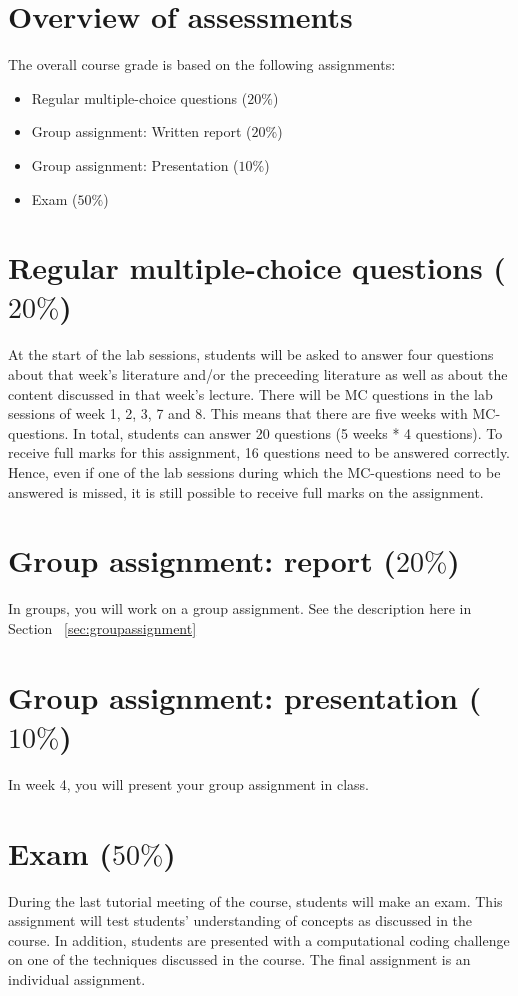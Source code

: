 \documentclass[a4paper,10pt]{report}
\begin{document}
\section{Overview of assessments}
The overall course grade is based on the following assignments:
\begin{itemize}
	\item Regular multiple-choice questions (\(20\%\))
	\item Group assignment: Written report (\(20\%\))
	\item Group assignment: Presentation (\(10\%\))
	\item Exam (\(50\%\))
\end{itemize}

\section{Regular multiple-choice questions ($20\%$)}
At the start of the lab sessions, students will be asked to answer four questions about that week's literature and/or the preceeding literature as well as about the content discussed in that week's lecture. There will be MC questions in the lab sessions of week 1, 2, 3, 7 and 8. This means that there are five weeks with MC-questions. In total, students can answer 20 questions (5 weeks * 4 questions). To receive full marks for this assignment, 16 questions need to be answered correctly. Hence, even if one of the lab sessions during which the MC-questions need to be answered is missed, it is still possible to receive full marks on the assignment.
	
\section{Group assignment: report ($20\%$)}
In groups, you will work on a group assignment. See the description here in Section ~\ref{sec:groupassignment}

\section{Group assignment: presentation ($10\%$)}
In week 4, you will present your group assignment in class. 

\section{Exam ($50\%$)}
During the last tutorial meeting of the course, students will make an exam. This assignment will test students' understanding of concepts as discussed in the course. In addition, students are presented with a computational coding challenge on one of the techniques discussed in the course. The final assignment is an individual assignment. 
\end{document}
